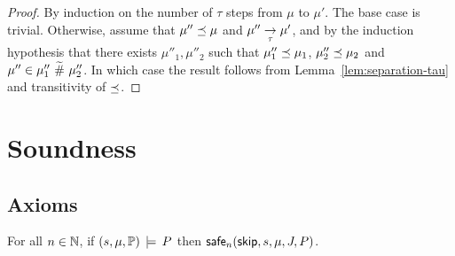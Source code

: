 \documentclass[11pt]{report}         %
\begin{document}
\begin{proof}
  By induction on the number of $\tau$ steps from $\mu$ to $\mu'$. The base case is trivial. Otherwise, assume that $\mu'' \preceq \mu$ and $\mu'' \underset{\tau}{\rightarrow} \mu'$, and by the induction hypothesis that there exists $\mu''_1,\mu''_2$ such that $\mu''_1 \preceq \mu_1$, $\mu''_2 \preceq \mu_2$ and $\mu'' \in \mu''_1 \operatorname{\,\widetilde{\#}\,} \mu''_2$. In which case the result follows from Lemma~\ref{lem:separation-tau} and transitivity of $\preceq$.
\end{proof}

\section{Soundness}
\label{sec:soundness-proofs}

\subsection{Axioms}

\begin{lemma}
      \label{lem:skip-safe}
      For all $n \in \mathbb{N}$, if $(s,\mu,\mathbb{P}) \,\models\, P$ then $\mathsf{safe}_{n}(\operatorname{\mathsf{skip}},s,\mu,J,P)$. 
\end{lemma}
\end{document}
